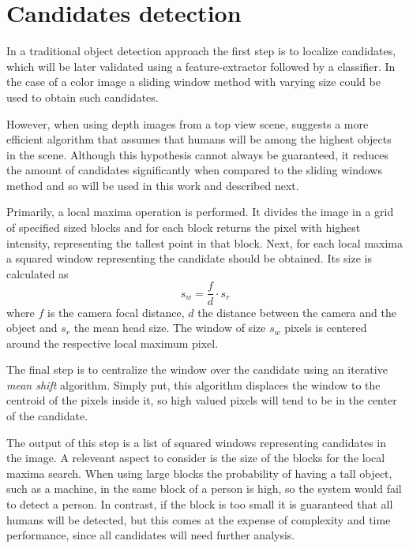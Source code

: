 \section{Candidates detection}
\label{sec:candidates}

    In a traditional object detection approach \cite{traditional-objdetect} the first step is to localize candidates, which will be later validated using a feature-extractor followed by a classifier. In the case of a color image a sliding window method with varying size could be used to obtain such candidates.

    However, when using depth images from a top view scene, \cite{rauter} suggests a more efficient algorithm that assumes that humans will be among the highest objects in the scene. Although this hypothesis cannot always be guaranteed, it reduces the amount of candidates significantly when compared to the sliding windows method and so will be used in this work and described next.

    Primarily, a local maxima operation is performed. It divides the image in a grid of specified sized blocks and for each block returns the pixel with highest intensity, representing the tallest point in that block. Next, for each local maxima a squared window representing the candidate should be obtained. Its size is calculated as
    \begin{equation}
      s_w = \frac{f}{d} \cdot s_r
    \end{equation}
    where $f$ is the camera focal distance, $d$ the distance between the camera and the object and $s_r$ the mean head size. The window of size $s_w$ pixels is centered around the respective local maximum pixel.

    The final step is to centralize the window over the candidate using an iterative \textit{mean shift} algorithm. Simply put, this algorithm displaces the window to the centroid of the pixels inside it, so high valued pixels will tend to be in the center of the candidate.

    The output of this step is a list of squared windows representing candidates in the image. A releveant aspect to consider is the size of the blocks for the local maxima search. When using large blocks the probability of having a tall object, such as a machine, in the same block of a person is high, so the system would fail to detect a person. In contrast, if the block is too small it is guaranteed that all humans will be detected, but this comes at the expense of complexity and time performance, since all candidates will need further analysis.

